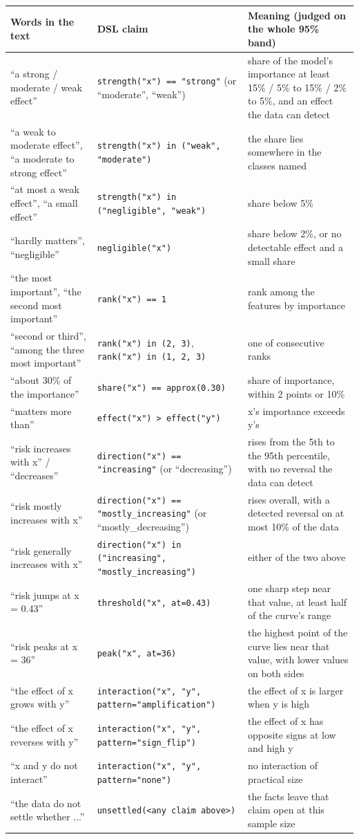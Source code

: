 \begin{tabular}{p{3.3cm}p{5.1cm}p{6.4cm}}
\toprule
\textbf{Words in the text} & \textbf{DSL claim} & \textbf{Meaning (judged on the whole 95\% band)} \\
\midrule
“a strong / moderate / weak effect” & \texttt{strength("x") == "strong"} (or “moderate”, “weak”) & share of the model's importance at least 15\% / 5\% to 15\% / 2\% to 5\%, and an effect the data can detect \\
“a weak to moderate effect”, “a moderate to strong effect” & \texttt{strength("x") in ("weak", "moderate")} & the share lies somewhere in the classes named \\
“at most a weak effect”, “a small effect” & \texttt{strength("x") in ("negligible", "weak")} & share below 5\% \\
“hardly matters”, “negligible” & \texttt{negligible("x")} & share below 2\%, or no detectable effect and a small share \\
“the most important”, “the second most important” & \texttt{rank("x") == 1} & rank among the features by importance \\
“second or third”, “among the three most important” & \texttt{rank("x") in (2, 3)}, \texttt{rank("x") in (1, 2, 3)} & one of consecutive ranks \\
“about 30\% of the importance” & \texttt{share("x") == approx(0.30)} & share of importance, within 2 points or 10\% \\
“matters more than” & \texttt{effect("x") > effect("y")} & x's importance exceeds y's \\
“risk increases with x” / “decreases” & \texttt{direction("x") == "increasing"} (or “decreasing”) & rises from the 5th to the 95th percentile, with no reversal the data can detect \\
“risk mostly increases with x” & \texttt{direction("x") == "mostly\_increasing"} (or “mostly\_decreasing”) & rises overall, with a detected reversal on at most 10\% of the data \\
“risk generally increases with x” & \texttt{direction("x") in ("increasing", "mostly\_increasing")} & either of the two above \\
“risk jumps at x = 0.43” & \texttt{threshold("x", at=0.43)} & one sharp step near that value, at least half of the curve's range \\
“risk peaks at x = 36” & \texttt{peak("x", at=36)} & the highest point of the curve lies near that value, with lower values on both sides \\
“the effect of x grows with y” & \texttt{interaction("x", "y", pattern="amplification")} & the effect of x is larger when y is high \\
“the effect of x reverses with y” & \texttt{interaction("x", "y", pattern="sign\_flip")} & the effect of x has opposite signs at low and high y \\
“x and y do not interact” & \texttt{interaction("x", "y", pattern="none")} & no interaction of practical size \\
“the data do not settle whether ...” & \texttt{unsettled(<any claim above>)} & the facts leave that claim open at this sample size \\
\bottomrule
\end{tabular}
